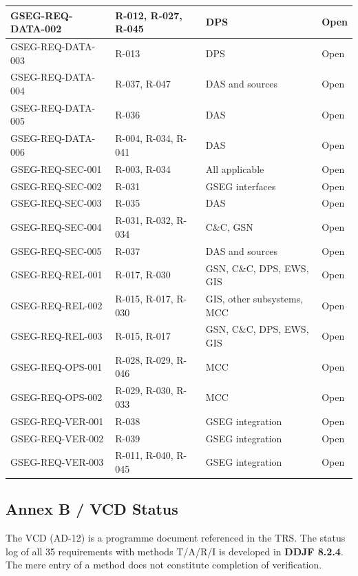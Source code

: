 \begin{longtable}{|P{0.27}|P{0.24}|P{0.33}|P{0.16}|}
GSEG-REQ-DATA-002 & R-012, R-027, R-045 & DPS & Open\\ \hline
GSEG-REQ-DATA-003 & R-013 & DPS & Open\\ \hline
GSEG-REQ-DATA-004 & R-037, R-047 & DAS and sources & Open\\ \hline
GSEG-REQ-DATA-005 & R-036 & DAS & Open\\ \hline
GSEG-REQ-DATA-006 & R-004, R-034, R-041 & DAS & Open\\ \hline
GSEG-REQ-SEC-001 & R-003, R-034 & All applicable & Open\\ \hline
GSEG-REQ-SEC-002 & R-031 & GSEG interfaces & Open\\ \hline
GSEG-REQ-SEC-003 & R-035 & DAS & Open\\ \hline
GSEG-REQ-SEC-004 & R-031, R-032, R-034 & C\&C, GSN & Open\\ \hline
GSEG-REQ-SEC-005 & R-037 & DAS and sources & Open\\ \hline
GSEG-REQ-REL-001 & R-017, R-030 & GSN, C\&C, DPS, EWS, GIS & Open\\ \hline
GSEG-REQ-REL-002 & R-015, R-017, R-030 & GIS, other subsystems, MCC & Open\\ \hline
GSEG-REQ-REL-003 & R-015, R-017 & GSN, C\&C, DPS, EWS, GIS & Open\\ \hline
GSEG-REQ-OPS-001 & R-028, R-029, R-046 & MCC & Open\\ \hline
GSEG-REQ-OPS-002 & R-029, R-030, R-033 & MCC & Open\\ \hline
GSEG-REQ-VER-001 & R-038 & GSEG integration & Open\\ \hline
GSEG-REQ-VER-002 & R-039 & GSEG integration & Open\\ \hline
GSEG-REQ-VER-003 & R-011, R-040, R-045 & GSEG integration & Open\\*
\end{longtable}
\endgroup

\subsection{Annex B /\allowbreak{} VCD Status}

The VCD (AD-12) is a programme document referenced in the TRS. The status log of all 35 requirements with methods T/\allowbreak{}A/\allowbreak{}R/\allowbreak{}I is developed in \textbf{DDJF 8.2.4}. The mere entry of a method does not constitute completion of verification.
